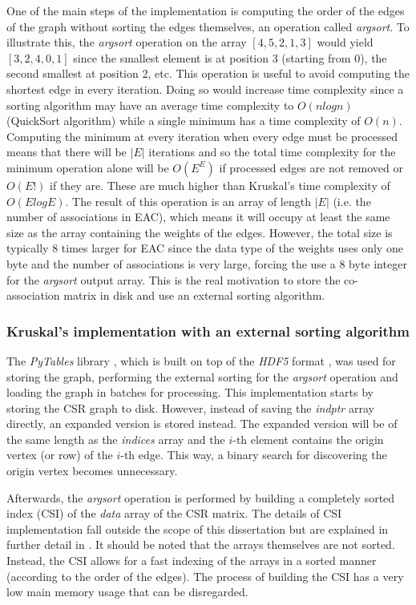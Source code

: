 One of the main steps of the implementation is computing the order of the edges of the graph without sorting the edges themselves, an operation called \emph{argsort}.
To illustrate this, the \emph{argsort} operation on the array $ \left [  4 , 5 , 2 , 1, 3 \right ]$ would yield $ \left [  3 , 2 , 4, 0 , 1 \right ]$ since the smallest element is at position 3 (starting from 0), the second smallest at position 2, etc.
This operation is useful to avoid computing the shortest edge in every iteration.
Doing so would increase time complexity since a sorting algorithm may have an average time complexity to $O(n log n)$ (QuickSort algorithm) while a single minimum has a time complexity of $O(n)$.
Computing the minimum at every iteration when every edge must be processed means that there will be $|E|$ iterations and so the total time complexity for the minimum operation alone will be $O(E ^ E)$ if processed edges are not removed or $O(E!)$ if they are.
These are much higher than Kruskal's time complexity of $O(E log E)$.
The result of this operation is an array of length $|E|$ (i.e. the number of associations in EAC), which means it will occupy at least the same size as the array containing the weights of the edges.
However, the total size is typically 8 times larger for EAC since the data type of the weights uses only one byte and the number of associations is very large, forcing the use a 8 byte integer for the \emph{argsort} output array.
This is the real motivation to store the co-association matrix in disk and use an external sorting algorithm.

\subsubsection{Kruskal's implementation with an external sorting algorithm}

The \emph{PyTables} library \cite{pytables}, which is built on top of the \emph{HDF5} format \cite{hdf5}, was used for storing the graph, performing the external sorting for the \emph{argsort} operation and loading the graph in batches for processing.
This implementation starts by storing the CSR graph to disk.
However, instead of saving the \emph{indptr} array directly, an expanded version is stored instead.
The expanded version will be of the same length as the \emph{indices} array and the $i$-th element contains the origin vertex (or row) of the $i$-th edge.
This way, a binary search for discovering the origin vertex becomes unnecessary.

Afterwards, the \emph{argsort} operation is performed by building a completely sorted index (CSI) of the \emph{data} array of the CSR matrix.
The details of CSI implementation fall outside the scope of this dissertation but are explained in further detail in \cite{AltetiAbad2007}.
It should be noted that the arrays themselves are not sorted.
Instead, the CSI allows for a fast indexing of the arrays in a sorted manner (according to the order of the edges).
The process of building the CSI has a very low main memory usage that can be disregarded.

